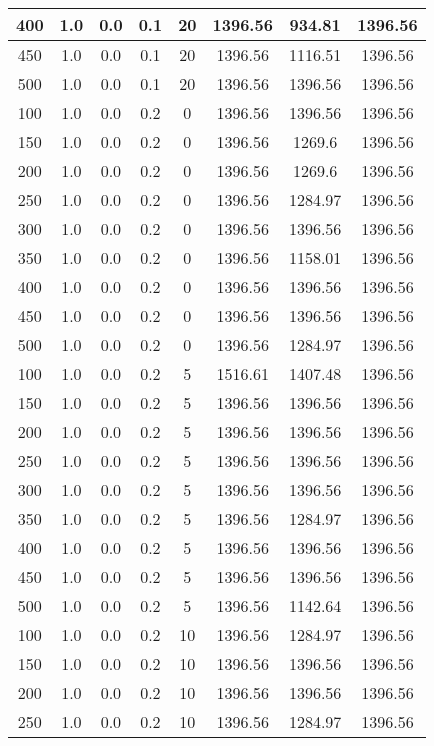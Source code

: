 \documentclass[a4paper, 12pt]{extreport}
\begin{document}
\begin{itemize}
\begin{longtable}{|c|c|c|c|c|c|c|c|}
			400 & 1.0 & 0.0 & 0.1 & 20 & 1396.56 & 934.81 & 1396.56 \\\hline
			450 & 1.0 & 0.0 & 0.1 & 20 & 1396.56 & 1116.51 & 1396.56 \\\hline
			500 & 1.0 & 0.0 & 0.1 & 20 & 1396.56 & 1396.56 & 1396.56 \\\hline
			100 & 1.0 & 0.0 & 0.2 & 0 & 1396.56 & 1396.56 & 1396.56 \\\hline
			150 & 1.0 & 0.0 & 0.2 & 0 & 1396.56 & 1269.6 & 1396.56 \\\hline
			200 & 1.0 & 0.0 & 0.2 & 0 & 1396.56 & 1269.6 & 1396.56 \\\hline
			250 & 1.0 & 0.0 & 0.2 & 0 & 1396.56 & 1284.97 & 1396.56 \\\hline
			300 & 1.0 & 0.0 & 0.2 & 0 & 1396.56 & 1396.56 & 1396.56 \\\hline
			350 & 1.0 & 0.0 & 0.2 & 0 & 1396.56 & 1158.01 & 1396.56 \\\hline
			400 & 1.0 & 0.0 & 0.2 & 0 & 1396.56 & 1396.56 & 1396.56 \\\hline
			450 & 1.0 & 0.0 & 0.2 & 0 & 1396.56 & 1396.56 & 1396.56 \\\hline
			500 & 1.0 & 0.0 & 0.2 & 0 & 1396.56 & 1284.97 & 1396.56 \\\hline
			100 & 1.0 & 0.0 & 0.2 & 5 & 1516.61 & 1407.48 & 1396.56 \\\hline
			150 & 1.0 & 0.0 & 0.2 & 5 & 1396.56 & 1396.56 & 1396.56 \\\hline
			200 & 1.0 & 0.0 & 0.2 & 5 & 1396.56 & 1396.56 & 1396.56 \\\hline
			250 & 1.0 & 0.0 & 0.2 & 5 & 1396.56 & 1396.56 & 1396.56 \\\hline
			300 & 1.0 & 0.0 & 0.2 & 5 & 1396.56 & 1396.56 & 1396.56 \\\hline
			350 & 1.0 & 0.0 & 0.2 & 5 & 1396.56 & 1284.97 & 1396.56 \\\hline
			400 & 1.0 & 0.0 & 0.2 & 5 & 1396.56 & 1396.56 & 1396.56 \\\hline
			450 & 1.0 & 0.0 & 0.2 & 5 & 1396.56 & 1396.56 & 1396.56 \\\hline
			500 & 1.0 & 0.0 & 0.2 & 5 & 1396.56 & 1142.64 & 1396.56 \\\hline
			100 & 1.0 & 0.0 & 0.2 & 10 & 1396.56 & 1284.97 & 1396.56 \\\hline
			150 & 1.0 & 0.0 & 0.2 & 10 & 1396.56 & 1396.56 & 1396.56 \\\hline
			200 & 1.0 & 0.0 & 0.2 & 10 & 1396.56 & 1396.56 & 1396.56 \\\hline
			250 & 1.0 & 0.0 & 0.2 & 10 & 1396.56 & 1284.97 & 1396.56 \\\hline

\end{longtable}
\end{itemize}
\end{document}
